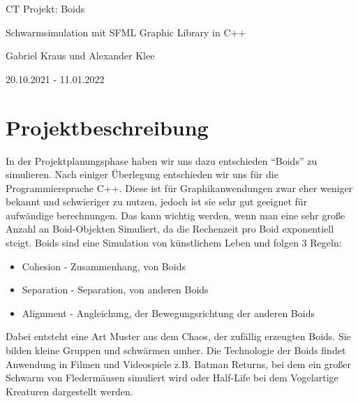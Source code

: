 \documentclass{article}
\begin{document}
    
    \begin{titlepage}
        \begin{center}
            \hspace{0cm}
            \vfill
            
            \Huge
            CT Projekt: Boids
            
            \vspace{0.3cm}
            
            \Large
            Schwarmsimulation mit SFML Graphic Library in C++
            
            \vspace{0.3cm}
            
            \large
            Gabriel Kraus und Alexander Klee
            
            \vspace{0.3cm}
            
            20.10.2021 - 11.01.2022
            
            \vfill
            \hspace{0cm}
        \end{center}
    \end{titlepage}

    \tableofcontents
    \pagebreak
    
    \section{Projektbeschreibung}
    In der Projektplanungsphase haben wir uns dazu entschieden “Boids” zu simulieren. Nach einiger Überlegung entschieden wir uns für die Programmiersprache C++. Diese ist für Graphikanwendungen zwar eher weniger bekannt und schwieriger zu nutzen, jedoch ist sie sehr gut geeignet für aufwändige berechnungen. Das kann wichtig werden, wenn man eine sehr große Anzahl an Boid-Objekten Simuliert, da die Rechenzeit pro Boid exponentiell steigt. 
    \newline
    Boids sind eine Simulation von künstlichem Leben und folgen 3 Regeln:
    \begin{itemize}
        \item Cohesion - Zusammenhang, von Boids 
        \item Separation - Separation, von anderen Boids 
        \item Alignment - Angleichung, der Bewegungsrichtung der anderen Boids
    \end{itemize}
    Dabei entsteht eine Art Muster aus dem Chaos, der zufällig erzeugten Boids. Sie bilden kleine Gruppen und schwärmen umher. Die Technologie der Boids findet Anwendung in Filmen und Videospiele z.B. Batman Returns, bei dem ein großer Schwarm von Fledermäusen simuliert wird oder Half-Life bei dem Vogelartige Kreaturen dargestellt werden. 
    
\end{document}
